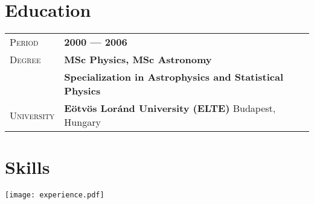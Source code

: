 \documentclass[a4paper, oneside, final]{scrartcl} %
\newcommand{\gray}{\rowcolor[gray]{.90}} %
\begin{document}
\begin{center}

\vspace{-12pt}

\section{Education}

\begin{tabularx}{0.97\linewidth}{>{\raggedleft\scshape}p{2cm}X}
\gray Period & \textbf{2000 --- 2006}\\
\gray Degree & \textbf{MSc Physics, MSc Astronomy}\\
\gray        & \textbf{Specialization in Astrophysics and Statistical Physics}\\
\gray University & \textbf{Eötvös Loránd University (ELTE)
} \hfill Budapest, Hungary\\
\end{tabularx}



\section{Skills}

\texttt{[image: experience.pdf]}


\end{center}
\end{document}
